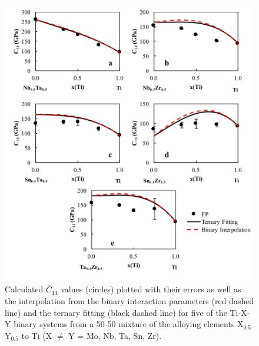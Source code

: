 \pagebreak
\begin{figure}[H]
	\centering
	\includegraphics[width=\textwidth]{Chapter-6/Figures/tixyc112.png}
	\caption{Calculated $\overline{C}_{11}$ values (circles) plotted with their errors as well as the interpolation from the binary interaction parameters (red dashed line) and the ternary fitting (black dashed line) for five of the Ti-X-Y binary systems from a 50-50 mixture of the alloying elements X$_{0.5}$Y$_{0.5}$ to Ti (X $\neq$ Y = Mo, Nb, Ta, Sn, Zr).}
	\label{Ch6-figure:tixyc11_2}
\end{figure}


